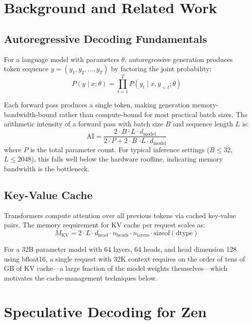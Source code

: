 \documentclass[11pt,a4paper]{article}
\begin{document}
\section{Background and Related Work}

\subsection{Autoregressive Decoding Fundamentals}

For a language model with parameters $\theta$, autoregressive generation produces token sequence $y = (y_1, y_2, \ldots, y_T)$ by factoring the joint probability:
\begin{equation}
P(y \mid x; \theta) = \prod_{t=1}^{T} P(y_t \mid x, y_{<t}; \theta)
\end{equation}

Each forward pass produces a single token, making generation memory-bandwidth-bound rather than compute-bound for most practical batch sizes. The arithmetic intensity of a forward pass with batch size $B$ and sequence length $L$ is:
\begin{equation}
\text{AI} = \frac{2 \cdot B \cdot L \cdot d_{\text{model}}}{2 \cdot P + 2 \cdot B \cdot L \cdot d_{\text{model}}}
\end{equation}
where $P$ is the total parameter count. For typical inference settings ($B \leq 32$, $L \leq 2048$), this falls well below the hardware roofline, indicating memory bandwidth is the bottleneck.

\subsection{Key-Value Cache}

Transformers compute attention over all previous tokens via cached key-value pairs. The memory requirement for KV cache per request scales as:
\begin{equation}
M_{\text{KV}} = 2 \cdot L \cdot d_{\text{head}} \cdot n_{\text{heads}} \cdot n_{\text{layers}} \cdot \text{sizeof}(\text{dtype})
\end{equation}

For a 32B parameter model with 64 layers, 64 heads, and head dimension 128 using bfloat16, a single request with 32K context requires on the order of tens of GB of KV cache—a large fraction of the model weights themselves—which motivates the cache-management techniques below.

\section{Speculative Decoding for Zen}
\end{document}
